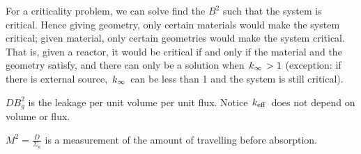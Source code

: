 \documentclass{school-22.211-notes}
\begin{document}
For a criticality problem, we can solve find the $B^2$ such that the system is critical. Hence giving geometry, only certain materials would make the system critical; given material, only certain geometries would make the system critical. That is, given a reactor, it would be critical if and only if the material and the geometry satisfy,
and there can only be a solution when $\left. k_{\infty} \right. > 1$ (exception: if there is external source, $\left. k_{\infty} \right.$ can be less than 1 and the system is still critical). 


$DB^2_g$ is the leakage per unit volume per unit flux. Notice $\left. k_{\mathrm{eff}} \right.$ does not depend on volume or flux. 


 $M^2 = \frac{D}{\Sigma_a}$ is a measurement of the amount of travelling before absorption. 
\end{document}
